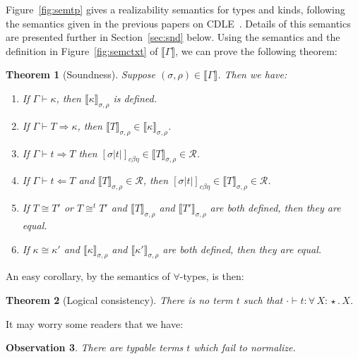 \documentclass{article}
\newcommand{\abs}[4]{{#1}\, #2\! : \! #3.\, #4}
\newcommand{\interp}[1]{\llbracket #1 \rrbracket}
\newcommand{\tpcheck}[0]{\Leftarrow}
\newcommand{\tpsynth}[0]{\Rightarrow}
\newcommand{\cbe}[0]{c\beta\eta}
\newtheorem{theorem}{Theorem}
\newtheorem{observation}[theorem]{Observation}
\begin{document}
Figure~\ref{fig:semtp} gives a realizability semantics for types and
kinds, following the semantics given in the previous papers on
CDLE~\cite{stump18,stump17}.  Details of this semantics are presented
further in Section~\ref{sec:snd} below.  Using the semantics and the
definition in Figure~\ref{fig:semctxt} of $\interp{\Gamma}$, we can
prove the following theorem:
\begin{theorem}[Soundness]
\label{thm:snd}
Suppose $(\sigma,\rho)\in\interp{\Gamma}$.  Then we have:
\begin{enumerate}
\item If $\Gamma\vdash \kappa$, then $\interp{\kappa}_{\sigma,\rho}$ is defined.
\item If $\Gamma\vdash T \tpsynth \kappa$, then $\interp{T}_{\sigma,\rho}\in\interp{\kappa}_{\sigma,\rho}$.
\item If $\Gamma\vdash t \tpsynth T$ then $[\sigma |t|]_{\cbe}\in\interp{T}_{\sigma,\rho}\in \mathcal{R}$.
\item If $\Gamma\vdash t \tpcheck T$ and $\interp{T}_{\sigma,\rho}\in \mathcal{R}$, then
    $[\sigma |t|]_{\cbe}\in\interp{T}_{\sigma,\rho}\in \mathcal{R}$.
\item If $T \cong T'$ or $T \cong^t T'$ and $\interp{T}_{\sigma,\rho}$ and $\interp{T'}_{\sigma,\rho}$ are both defined, then they are equal.
\item If \(\kappa \cong \kappa'\) and \(\interp{\kappa}_{\sigma,\rho}\) and
  \(\interp{\kappa'}_{\sigma,\rho}\) are both defined, then they are equal.
\end{enumerate}
\end{theorem}

An easy corollary, by the semantics of $\forall$-types, is then:

\begin{theorem}[Logical consistency]
\label{thm:consis}
  There is no term $t$ such that $\cdot \vdash t : \abs{\forall}{X}{\star}{X}$.
\end{theorem}

It may worry some readers that we have:
\begin{observation}
  There are typable terms $t$ which fail to normalize.
\end{observation}
\end{document}
